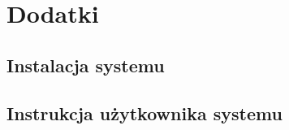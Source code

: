 \newpage\section{Dodatki} 
\subsection{Instalacja systemu \NazwaSys}
\subsection{Instrukcja użytkownika systemu \NazwaSys}
 
